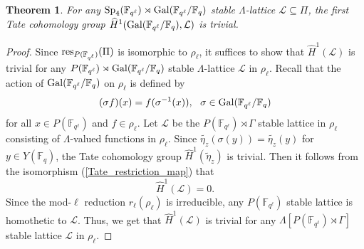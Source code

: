 \documentclass[10pt, reqno]{amsart}
\theoremstyle{plain}
\numberwithin{equation}{section} \newcommand{\di}{\operatorname{dim}}
\newtheorem{theorem}{Theorem}[subsection]
\begin{document}
\begin{theorem}
For any ${\rm Sp}_4(\mathbb{F}_{q^\ell})\rtimes 
{\rm Gal}(\mathbb{F}_{q^\ell}/\mathbb{F}_q)$ stable 
$\Lambda$-lattice 
$\mathcal{L}\subseteq \Pi$, the first 
Tate cohomology group $\widehat{H}^1(
{\rm Gal}(\mathbb{F}_{q^\ell}/\mathbb{F}_q), \mathcal{L})$ 
is trivial.
\end{theorem}
\begin{proof}
Since ${\rm res}_{P(\mathbb{F}_{q^\ell})}(\Pi)$ 
is isomorphic to $\rho_\ell$, it suffices 
to show that $\widehat{H}^1(\mathcal{L})$ 
is trivial 
for any $P(\mathbb{F}_{q^\ell})\rtimes 
{\rm Gal}(\mathbb{F}_{q^\ell}/\mathbb{F}_q)$ stable 
$\Lambda$-lattice 
$\mathcal{L}$ in $\rho_\ell$. Recall that 
the action of 
${\rm Gal}(\mathbb{F}_{q^\ell}/\mathbb{F}_q)$
on $\rho_\ell$ 
is defined by 
$$ (\sigma f)(x) = f(\sigma^{-1}(x)),\ \  \sigma\in 
{\rm Gal}(\mathbb{F}_{q^\ell}/\mathbb{F}_q)$$ for all
$x\in P(\mathbb{F}_{q^\ell})$ and $f\in \rho_\ell$. Let $\mathcal{L}$
be the $P(\mathbb{F}_{q^\ell})\rtimes \Gamma$ stable
lattice in $\rho_\ell$ consisting of 
$\Lambda$-valued functions in $\rho_\ell$. Since
$\widetilde{\eta_z}(\sigma(y)) = \widetilde{\eta_z}(y)$ for
$y\in Y(\mathbb{F}_q)$, the Tate cohomology group
$\widehat{H}^1(\widetilde{\eta}_z)$ is trivial.  Then it follows from the
isomorphism (\ref{Tate_restriction_map}) that
$$ \widehat{H}^1(\mathcal{L}) = 0. $$
Since the mod-$\ell$ reduction $r_\ell(\rho_\ell)$ is irreducible, any
$P(\mathbb{F}_{q^\ell})$ stable lattice is homothetic to
$\mathcal{L}$.  Thus, we get that $\widehat{H}^1(\mathcal{L})$ is
trivial for any $\Lambda[P(\mathbb{F}_{q^\ell})\rtimes \Gamma]$ stable
lattice $\mathcal{L}$ in $\rho_\ell$.
\end{proof}
\end{document}
